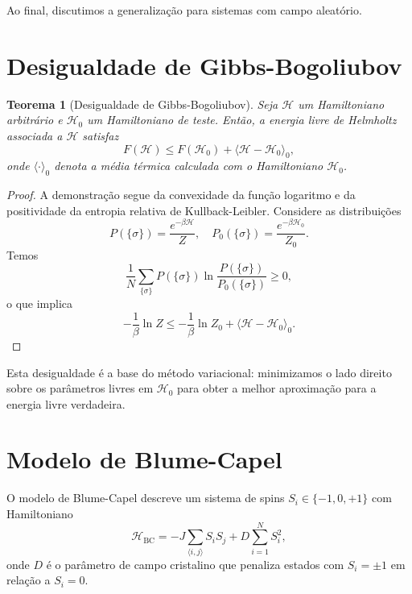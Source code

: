 \documentclass[12pt]{article}
\newtheorem{teorema}{Teorema}
\begin{document}
Ao final, discutimos a generalização para sistemas com campo aleatório.

\section{Desigualdade de Gibbs-Bogoliubov}

\begin{teorema}[Desigualdade de Gibbs-Bogoliubov]
Seja $\mathcal{H}$ um Hamiltoniano arbitrário e $\mathcal{H}_0$ um Hamiltoniano de teste. Então, a energia livre de Helmholtz associada a $\mathcal{H}$ satisfaz
\begin{equation}
    F(\mathcal{H}) \leq F(\mathcal{H}_0) + \langle \mathcal{H} - \mathcal{H}_0 \rangle_0,
\end{equation}
onde $\langle \cdot \rangle_0$ denota a média térmica calculada com o Hamiltoniano $\mathcal{H}_0$.
\end{teorema}

\begin{proof}
A demonstração segue da convexidade da função logaritmo e da positividade da entropia relativa de Kullback-Leibler. Considere as distribuições
\begin{equation}
    P(\{\sigma\}) = \frac{e^{-\beta \mathcal{H}}}{Z}, \quad P_0(\{\sigma\}) = \frac{e^{-\beta \mathcal{H}_0}}{Z_0}.
\end{equation}
Temos
\begin{equation}
    \frac{1}{N} \sum_{\{\sigma\}} P(\{\sigma\}) \ln \frac{P(\{\sigma\})}{P_0(\{\sigma\})} \geq 0,
\end{equation}
o que implica
\begin{equation}
    -\frac{1}{\beta} \ln Z \leq -\frac{1}{\beta} \ln Z_0 + \langle \mathcal{H} - \mathcal{H}_0 \rangle_0.
\end{equation}
\end{proof}

Esta desigualdade é a base do método variacional: minimizamos o lado direito sobre os parâmetros livres em $\mathcal{H}_0$ para obter a melhor aproximação para a energia livre verdadeira.

\section{Modelo de Blume-Capel}

O modelo de Blume-Capel descreve um sistema de spins $S_i \in \{-1, 0, +1\}$ com Hamiltoniano
\begin{equation}
    \mathcal{H}_{\text{BC}} = -J \sum_{\langle i,j \rangle} S_i S_j + D \sum_{i=1}^N S_i^2,
\end{equation}
onde $D$ é o parâmetro de campo cristalino que penaliza estados com $S_i = \pm 1$ em relação a $S_i = 0$.
\end{document}
